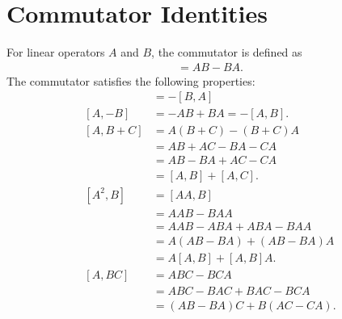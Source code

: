 \section{Commutator Identities}
For linear operators $A$ and $B$, the commutator is defined as
\begin{align*}
    [A,B] = AB - BA.
\end{align*}
The commutator satisfies the following properties:
\begin{align}
    [A,B] &= -[B,A] \label{eq:BA} \\
    [A,-B] &= -AB + BA = -[A,B].\label{eq:AmB} \\
    [A,B+C] 
        &= A(B+C) - (B+C)A \nonumber\\
        &= AB + AC - BA - CA \nonumber\\
        &= AB - BA + AC - CA \nonumber\\
        &= [A,B] + [A,C]. \label{eq:ABpC} \\
    [A^2,B] 
        &= [AA,B] \nonumber\\
        &= AAB - BAA \nonumber\\
        &= AAB - ABA + ABA - BAA \nonumber\\
        &= A(AB-BA) + (AB-BA)A \nonumber\\
        &= A[A,B] + [A,B]A.\label{eq:A2B}\\
    [A,BC]
        &= ABC - BCA \nonumber\\
        &= ABC - BAC + BAC - BCA \nonumber\\
        &= (AB - BA)C + B(AC - CA).\label{eq:ABC}
\end{align}


